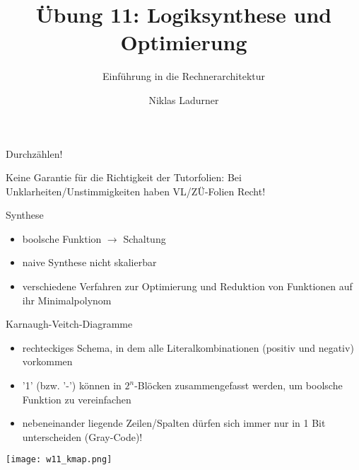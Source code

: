 \documentclass[
  german,            %
  aspectratio=169,    %
]{tumbeamer}
\title{Übung 11: Logiksynthese und\\Optimierung}
\subtitle{Einführung in die Rechnerarchitektur}
\author{Niklas Ladurner}
\institute{\theChairName\\\theDepartmentName\\\theUniversityName}
\date{\DTMdisplaydate{2024}{1}{12}{-1}}
\begin{document}
\maketitle

\begin{frame}[c]{}{}
  \begin{center}
    \LARGE  Durchzählen!
  \end{center}
\end{frame}

\begin{frame}[c]{}{}
  \begin{center}
    \LARGE  Keine Garantie für die Richtigkeit der Tutorfolien: Bei Unklarheiten/Unstimmigkeiten
    haben VL/ZÜ-Folien Recht!
  \end{center}
\end{frame}

\begin{frame}[fragile, c]{Synthese}{}
  \begin{itemize}
    \item boolsche Funktion $\rightarrow$ Schaltung
    \item naive Synthese nicht skalierbar
    \item verschiedene Verfahren zur Optimierung und Reduktion von Funktionen auf ihr Minimalpolynom
  \end{itemize}

\end{frame}

\begin{frame}[fragile, c]{Karnaugh-Veitch-Diagramme}{}
  \begin{itemize}
    \item rechteckiges Schema, in dem alle Literalkombinationen (positiv und negativ) vorkommen
    \item '1' (bzw. '-') können in $2^n$-Blöcken zusammengefasst werden, um boolsche Funktion zu vereinfachen
    \item nebeneinander liegende Zeilen/Spalten dürfen sich immer nur in 1 Bit unterscheiden (Gray-Code)!
  \end{itemize}
  \begin{center}
    \texttt{[image: w11\_kmap.png]}
  \end{center}
\end{frame}
\end{document}
